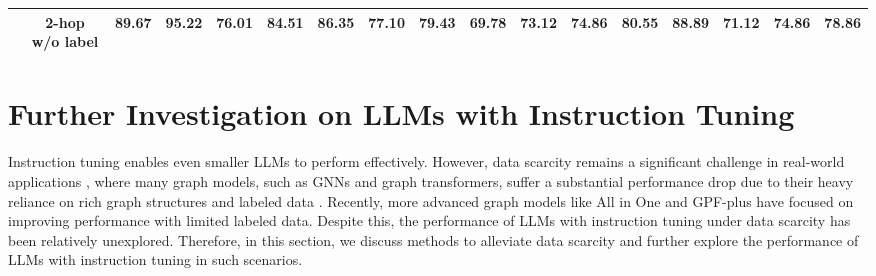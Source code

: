 \begin{table*}[htbp]
{\begin{tabular}{l c c c c c c | c c c c c | c c c c c}
& 2-hop w/o label & 89.67 \cellcolor{cyan!100} & 95.22 \cellcolor{cyan!100} & 76.01 \cellcolor{cyan!100} & 84.51 \cellcolor{cyan!100} & 86.35 \cellcolor{cyan!100} & 77.10 \cellcolor{cyan!100} & 79.43 \cellcolor{cyan!100} & 69.78 \cellcolor{cyan!50} & 73.12 \cellcolor{cyan!100} & 74.86 \cellcolor{cyan!100} & 80.55 \cellcolor{cyan!100} & 88.89 \cellcolor{cyan!100} & 71.12 \cellcolor{cyan!50} & 74.86 \cellcolor{cyan!100} & 78.86 \cellcolor{cyan!100} \\
\bottomrule
\end{tabular}
}
\end{table*}


\section{Further Investigation on LLMs with Instruction Tuning}
\label{sec:Research Questions}
Instruction tuning enables even smaller LLMs to perform effectively. However, data scarcity remains a significant challenge in real-world applications \cite{xia2024opengraph}, where many graph models, such as GNNs and graph transformers, suffer a substantial performance drop due to their heavy reliance on rich graph structures and labeled data \cite{yu2024survey}. Recently, more advanced graph models like All in One \cite{sun2023allinone} and GPF-plus \cite{gpf-plus} have focused on improving performance with limited labeled data. Despite this, the performance of LLMs with instruction tuning under data scarcity has been relatively unexplored. Therefore, in this section, we discuss methods to alleviate data scarcity and further explore the performance of LLMs with instruction tuning in such scenarios.




